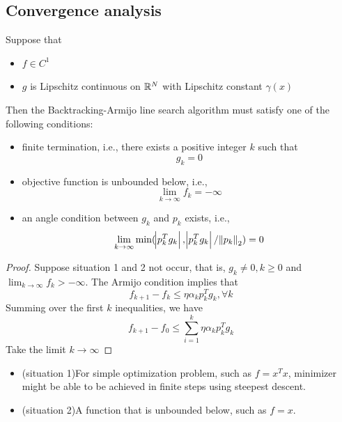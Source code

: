 \begin{refsection}
\subsection{Convergence analysis}
\begin{theorem}\cite{Robinson2015nonlinear}
	Suppose that
	\begin{itemize}
		\item $f\in C^1$
		\item $g$ is Lipschitz continuous on $\mathbb{R}^N$ with Lipschitz constant $\gamma(x)$
	\end{itemize}
	Then the Backtracking-Armijo line search algorithm must satisfy one of the following conditions:
	\begin{itemize}
		\item finite termination, i.e., there exists a positive integer $k$ such that
		$$g_k = 0$$
		\item objective function is unbounded below, i.e., 
		$$\lim_{k\to \infty} f_k = -\infty$$
		\item an angle condition between $g_k$ and $p_k$ exists, i.e., 
		$$\lim_{k\to\infty} \min(\abs{p_k^Tg_k},\abs{p^T_kg_k}/\norm{p_k}_2) = 0$$
	\end{itemize}
\end{theorem}
\begin{proof}
	Suppose situation 1 and 2 not occur, that is, $g_k \neq 0, k\geq 0$ and $\lim_{k\to \infty} f_k > -\infty$. 
	The Armijo condition implies that 
	$$f_{k+1}-f_k \leq \eta \alpha_k p_k^T g_k, \forall k$$
	Summing over the first $k$ inequalities, we have
	$$f_{k+1} - f_0 \leq \sum_{i=1}^k \eta \alpha_k p_k^T g_k$$
	Take the limit $k\to \infty$
\end{proof}



\begin{remark}\hfill
	\begin{itemize}
		\item (situation 1)For simple optimization problem, such as $f = x^Tx$, minimizer might be able to be achieved in finite steps using steepest descent. 
		\item (situation 2)A function that is unbounded below, such as $f = x$.
	\end{itemize}
\end{remark}


\end{refsection}
